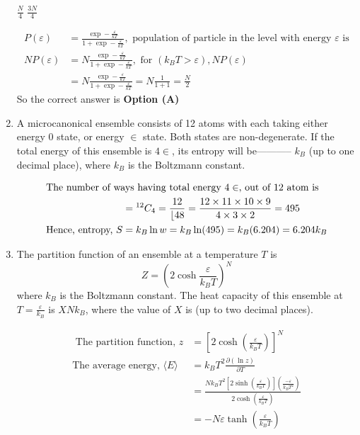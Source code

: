 \begin{enumerate}
\begin{tasks}
		\task[\textbf{C.}] $\frac{N}{4}$
		\task[\textbf{D.}] $\frac{3 N}{4}$
	\end{tasks}
	\begin{answer}
		\begin{align*}
		P(\varepsilon)&=\frac{\exp -\frac{\varepsilon}{k T}}{1+\exp -\frac{\varepsilon}{k T}},\text{ population of particle in the level with energy $\varepsilon$ is}\\
		N P(\varepsilon)&=N \frac{\exp -\frac{\varepsilon}{k T}}{1+\exp -\frac{\varepsilon}{k T}},\text{ for }\left(k_{B} T>\varepsilon\right), N P(\varepsilon)\\&=N \frac{\exp -\frac{\varepsilon}{k T}}{1+\exp -\frac{\varepsilon}{k T}}=N \frac{1}{1+1}=\frac{N}{2}
		\end{align*}
		So the correct answer is \textbf{Option (A)}
	\end{answer}	
	\item  A microcanonical ensemble consists of 12 atoms with each taking either energy 0 state, or energy $\in$ state. Both states are non-degenerate. If the total energy of this ensemble is $4 \in$, its entropy will be----------- $k_{B}$ (up to one decimal place), where $k_{B}$ is the Boltzmann constant.
	{}
	\begin{answer}
		\begin{align*}
		\intertext{The number of ways having total energy $4 \in$, out of 12 atom is}
		&={ }^{12} C_{4}=\frac{12}{\lfloor 48}=\frac{12 \times 11 \times 10 \times 9}{4 \times 3 \times 2}=495\\
		\text{Hence, entropy, }S&=k_{B} \ln w=k_{B} \ln (495)=k_{B}(6.204)=6.204 k_{B}
		\end{align*}
	\end{answer}	
	\item  The partition function of an ensemble at a temperature $T$ is
	$$
	Z=\left(2 \cosh \frac{\varepsilon}{k_{B} T}\right)^{N}
	$$
	where $k_{B}$ is the Boltzmann constant. The heat capacity of this ensemble at $T=\frac{\varepsilon}{k_{B}}$ is $X N k_{B}$, where the value of $X$ is (up to two decimal places).
	{}
	\begin{answer}
		\begin{align*}
		\text{	The partition function, }z&=\left[2 \cosh \left(\frac{\varepsilon}{k_{B} T}\right)\right]^{N}\\
		\text{The average energy, }\langle E\rangle&=k_{B} T^{2} \frac{\partial(\ln z)}{\partial T}\\
		&=\frac{N k_{B} T^{2}\left[2 \sinh \left(\frac{\varepsilon}{k_{B} T}\right)\right]\left(\frac{-\varepsilon}{k_{B} T^{2}}\right)}{2 \cosh \left(\frac{\varepsilon}{k_{B} T}\right)}\\&=-N \varepsilon \tanh \left(\frac{\varepsilon}{k_{B} T}\right)\\

\end{align*}
\end{answer}
\end{enumerate}
